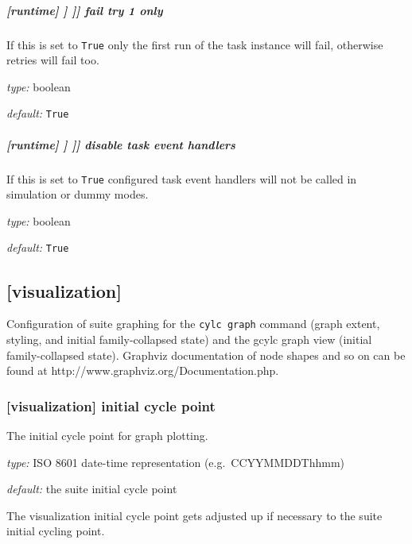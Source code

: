 \subparagraph[fail try 1 only]{[runtime] \textrightarrow [[\_\_NAME\_\_]] \textrightarrow [[[simulation]]] \textrightarrow fail try 1 only}

If this is set to \lstinline=True= only the first run of the task instance will
fail, otherwise retries will fail too.

\begin{myitemize}
    \item {\em type:} boolean
    \item {\em default:} \lstinline=True=
\end{myitemize}

\subparagraph[disable task event handlers]{[runtime] \textrightarrow [[\_\_NAME\_\_]] \textrightarrow [[[simulation]]] \textrightarrow disable task event handlers}

If this is set to \lstinline=True= configured task event handlers will not be called
in simulation or dummy modes.

\begin{myitemize}
    \item {\em type:} boolean
    \item {\em default:} \lstinline=True=
\end{myitemize}

\subsection{[visualization]}

Configuration of suite graphing for the \lstinline=cylc graph= command (graph
extent, styling, and initial family-collapsed state) and the gcylc graph view
(initial family-collapsed state). Graphviz documentation of node shapes
and so on can be found at http://www.graphviz.org/Documentation.php.

\subsubsection[initial cycle point]{[visualization] \textrightarrow initial cycle point}

The initial cycle point for graph plotting.
\begin{myitemize}
    \item {\em type:} ISO 8601 date-time representation (e.g.\  CCYYMMDDThhmm)
    \item {\em default:} the suite initial cycle point
\end{myitemize}
The visualization initial cycle point gets adjusted up if necessary to the
suite initial cycling point.

